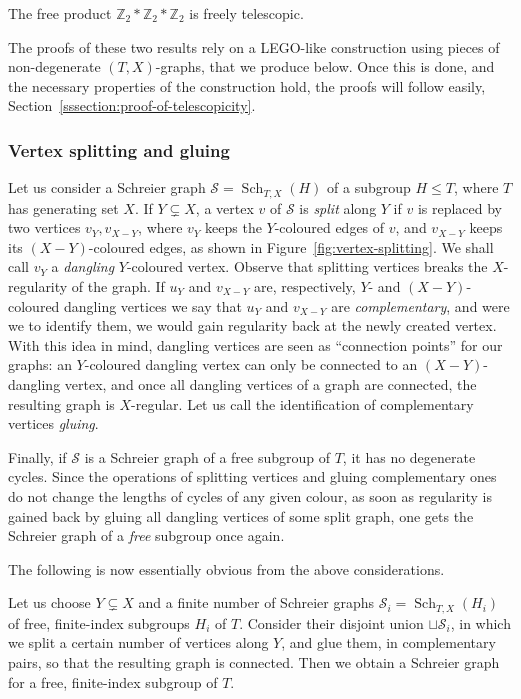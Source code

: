 \documentclass[ALCO,ThmDefs,Unicode,epreuves]{cedram}
\newcommand{\ZZ}{\mathbb{Z}}
\newcommand{\cS}{\mathcal{S}}
\DeclareMathOperator{\Sch}{Sch}
\begin{document}
\begin{prop}\label{prop:Z2Z2Z2-telescopic}
The free product $\ZZ_2 \ast \ZZ_2 \ast \ZZ_2$ is freely telescopic.
\end{prop}

The proofs of these two results rely on a LEGO-like construction using pieces of non-degenerate $(T,X)$-graphs, that we produce below.
Once this is done, and the necessary properties of the construction hold, the proofs will follow easily, %
\cf Section~\ref{sssection:proof-of-telescopicity}.


\subsubsection{Vertex splitting and gluing}
Let us consider a Schreier graph $\cS = \Sch_{T,X}(H)$ of a subgroup $H \leq T$, where $T$ has generating set $X$. If $Y \subsetneq X$, a vertex $v$ of $\cS$ is \emph{split} along $Y$ if $v$ is replaced by two vertices $v_Y,v_{X-Y}$, where $v_Y$ keeps the $Y$-coloured edges of $v$, and $v_{X-Y}$ keeps its $(X-Y)$-coloured edges, as shown in Figure~\ref{fig:vertex-splitting}. We shall call $v_Y$ a \emph{dangling} $Y$-coloured vertex. Observe that splitting vertices breaks the $X$-regularity of the graph. If $u_Y$ and $v_{X-Y}$ are, respectively, $Y$- and $(X-Y)$-coloured dangling vertices we say that $u_Y$ and $v_{X-Y}$ are \emph{complementary}, and were we to identify them, we would gain regularity back at the newly created vertex. With this idea in mind, dangling vertices are seen as ``connection points'' for our graphs: an $Y$-coloured dangling vertex can only be connected to an $(X-Y)$-dangling vertex, and once all dangling vertices of a graph are connected, the resulting graph is $X$-regular. Let us call the identification of complementary vertices \emph{gluing}.

Finally, if $\cS$ is a Schreier graph of a free subgroup of $T$, it has no degenerate cycles. Since the operations of splitting vertices and gluing complementary ones do not change the lengths of cycles of any given colour, as soon as regularity is gained back by gluing all dangling vertices of some split graph, one gets the Schreier graph of a \emph{free} subgroup once again.

The following is now essentially obvious from the above considerations. 
\begin{prop}\label{prop:splitting-gluing}
Let us choose $Y \varsubsetneq X$ and a finite number of Schreier graphs $\cS_i = \Sch_{T,X}(H_i)$ of free, finite-index subgroups $H_i$ of $T$. Consider their disjoint union ${\sqcup}\cS_i$, in which we split a certain number of vertices along $Y$, and glue them, in complementary pairs, so that the resulting graph is connected. Then we obtain a Schreier graph for a free, finite-index subgroup of $T$.
\end{prop}
\end{document}
